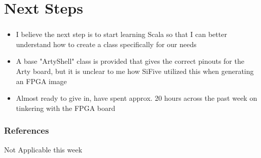 \documentclass{../weeklyslides}
\begin{document}
\section{Next Steps}\label{sec:Next_Steps}
\begin{frame}
  \frametitle{}
  	\begin{itemize}
  		\item I believe the next step is to start learning Scala so that I can better understand how to create a class specifically for our needs
  		\item A base "ArtyShell" class is provided that gives the correct pinouts for the Arty board, but it is unclear to me how SiFive utilized this when generating an FPGA image
  		\item Almost ready to give in, have spent approx. 20 hours across the past week on tinkering with the FPGA board
  	\end{itemize}
\end{frame}

\begin{frame}
  \frametitle{References}
  Not Applicable this week
  \printbibliography[heading=bibintoc]{}
\end{frame}
\end{document}

